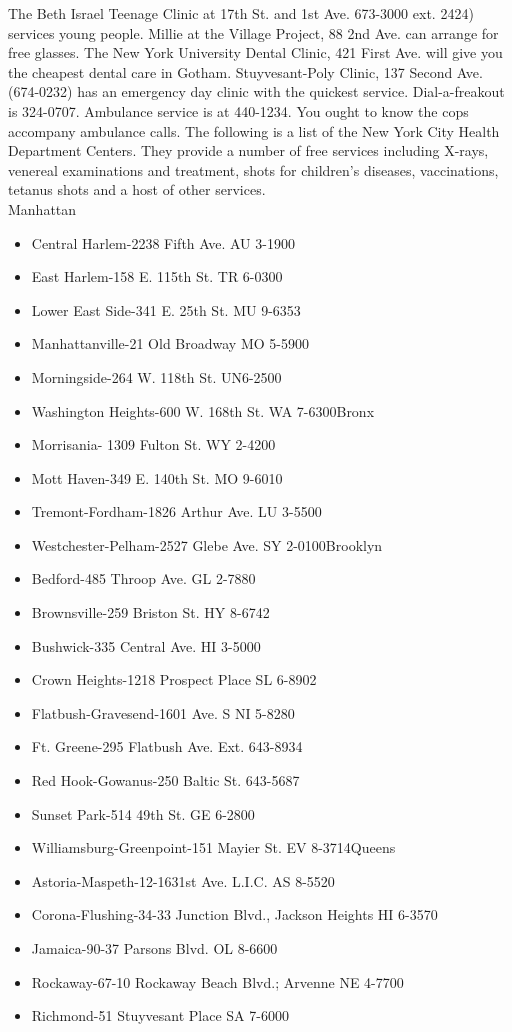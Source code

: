 \documentclass[11pt,twoside,a4paper]{book}
\begin{document}
The Beth Israel Teenage Clinic at 17th St. and 1st Ave. 673-3000 ext. 2424) services young people. Millie at the Village Project, 88 2nd Ave. can arrange for free glasses. The New York University Dental Clinic, 421 First Ave. will give you the cheapest dental care in Gotham. Stuyvesant-Poly Clinic, 137 Second Ave. (674-0232) has an emergency day clinic with the quickest service. Dial-a-freakout is 324-0707. Ambulance service is at 440-1234. You ought to know the cops accompany ambulance calls. The following is a list of the New York City Health Department Centers. They provide a number of free services including X-rays, venereal examinations and treatment, shots for children's diseases, vaccinations, tetanus shots and a host of other services.~\\
Manhattan 
\begin{itemize}
\item Central Harlem-2238 Fifth Ave. AU 3-1900 
\item East Harlem-158 E. 115th St. TR 6-0300 
\item Lower East Side-341 E. 25th St. MU 9-6353 \item Manhattanville-21 Old Broadway MO 5-5900 
\item Morningside-264 W. 118th St. UN6-2500 
\item Washington Heights-600 W. 168th St. WA 7-6300Bronx 
\item Morrisania- 1309 Fulton St. WY 2-4200 
\item Mott Haven-349 E. 140th St. MO 9-6010 
\item Tremont-Fordham-1826 Arthur Ave. LU 3-5500 
\item Westchester-Pelham-2527 Glebe Ave. SY 2-0100Brooklyn
\item Bedford-485 Throop Ave. GL 2-7880 
\item Brownsville-259 Briston St. HY 8-6742 
\item Bushwick-335 Central Ave. HI 3-5000 
\item Crown Heights-1218 Prospect Place SL 6-8902 
\item Flatbush-Gravesend-1601 Ave. S NI 5-8280 
\item Ft. Greene-295 Flatbush Ave. Ext. 643-8934 
\item Red Hook-Gowanus-250 Baltic St. 643-5687 
\item Sunset Park-514 49th St. GE 6-2800 
\item Williamsburg-Greenpoint-151 Mayier St. EV 8-3714Queens 
\item Astoria-Maspeth-12-1631st Ave. L.I.C. AS 8-5520 
\item Corona-Flushing-34-33 Junction Blvd., Jackson Heights HI 6-3570 
\item Jamaica-90-37 Parsons Blvd. OL 8-6600 
\item Rockaway-67-10 Rockaway Beach Blvd.; Arvenne NE 4-7700 
\item Richmond-51 Stuyvesant Place SA 7-6000
\end{itemize}
\end{document}
